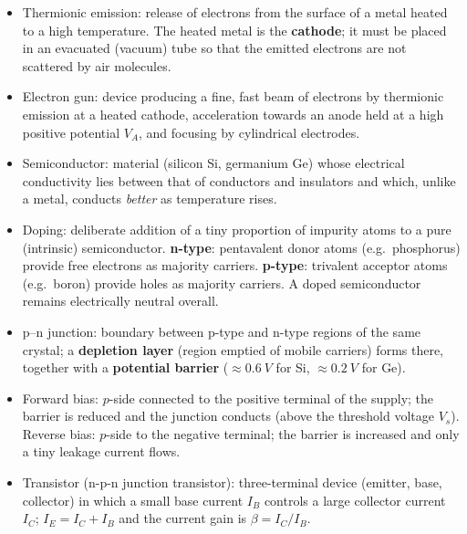 \documentclass[11pt]{article}
\newcommand{\cle}[1]{{\popxbold\color{popdark}#1}}
\begin{document}
\begin{aretenir}
\begin{itemize}
\item \cle{Thermionic emission}: release of electrons from the surface of a metal heated to a high temperature. The heated metal is the \textbf{cathode}; it must be placed in an evacuated (vacuum) tube so that the emitted electrons are not scattered by air molecules.
\item \cle{Electron gun}: device producing a fine, fast beam of electrons by thermionic emission at a heated cathode, acceleration towards an anode held at a high positive potential $V_A$, and focusing by cylindrical electrodes.
\item \cle{Semiconductor}: material (silicon Si, germanium Ge) whose electrical conductivity lies between that of conductors and insulators and which, unlike a metal, conducts \emph{better} as temperature rises.
\item \cle{Doping}: deliberate addition of a tiny proportion of impurity atoms to a pure (intrinsic) semiconductor. \textbf{n-type}: pentavalent donor atoms (e.g.\ phosphorus) provide free electrons as majority carriers. \textbf{p-type}: trivalent acceptor atoms (e.g.\ boron) provide holes as majority carriers. A doped semiconductor remains electrically neutral overall.
\item \cle{p--n junction}: boundary between p-type and n-type regions of the same crystal; a \textbf{depletion layer} (region emptied of mobile carriers) forms there, together with a \textbf{potential barrier} ($\approx \SI{0.6}{V}$ for Si, $\approx \SI{0.2}{V}$ for Ge).
\item \cle{Forward bias}: $p$-side connected to the positive terminal of the supply; the barrier is reduced and the junction conducts (above the threshold voltage $V_s$). \cle{Reverse bias}: $p$-side to the negative terminal; the barrier is increased and only a tiny leakage current flows.
\item \cle{Transistor} (n-p-n junction transistor): three-terminal device (emitter, base, collector) in which a small base current $I_B$ controls a large collector current $I_C$; $I_E = I_C + I_B$ and the current gain is $\beta = I_C/I_B$.
\end{itemize}
\end{aretenir}
\end{document}
